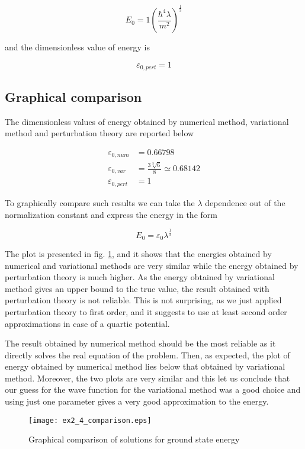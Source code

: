 \documentclass{article}
\begin{document}
\begin{equation}
E_0 = 1 \left( \frac{\hbar^4 \lambda}{m^2} \right)^{\frac{1}{3}}
\end{equation}

and the dimensionless value of energy is

\begin{equation}
\varepsilon_{0,pert} = 1
\end{equation}

\subsection{Graphical comparison}
The dimensionless values of energy obtained by numerical method, variational method and perturbation theory are reported below

\begin{align*}
\varepsilon_{0,num} & = 0.66798 \\
\varepsilon_{0,var} & = \frac{3\sqrt[3]{6}}{8} \simeq 0.68142 \\
\varepsilon_{0,pert} & = 1
\end{align*}

To graphically compare such results we can take the \(\lambda \) dependence out of the normalization constant and express the energy in the form

\begin{equation}
E_0 = \varepsilon_0 \lambda^{\frac{1}{3}}
\end{equation}

The plot is presented in fig. \ref{ex2_4_comparison}, and it shows that the energies obtained by numerical and variational methods are very similar while the energy obtained by perturbation theory is much higher. As the energy obtained by variational method gives an upper bound to the true value, the result obtained with perturbation theory is not reliable. This is not surprising, as we just applied perturbation theory to first order, and it suggests to use at least second order approximations in case of a quartic potential.

The result obtained by numerical method should be the most reliable as it directly solves the real equation of the problem. Then, as expected, the plot of energy obtained by numerical method lies below that obtained by variational method. Moreover, the two plots are very similar and this let us conclude that our guess for the wave function for the variational method was a good choice and using just one parameter gives a very good approximation to the energy.

\begin{figure}
\centering
\texttt{[image: ex2\_4\_comparison.eps]}
\caption{Graphical comparison of solutions for ground state energy}
\label{ex2_4_comparison}
\end{figure}
\end{document}
